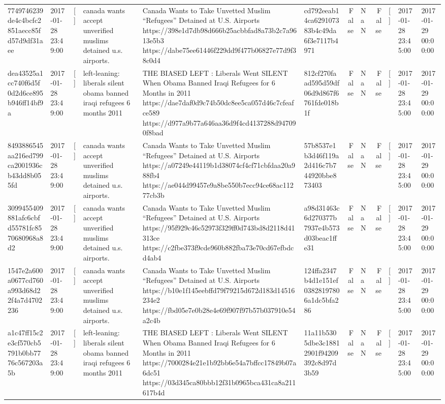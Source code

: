 \begin{tabular}{llllllrlrlll}
7749746239de4c4bcfc2851aecc85fd57d9df31aee & 2017-01-28 23:49:00 & [] & canada wants accept unverified muslims detained u.s. airports. & Canada Wants to Take Unvetted Muslim “Refugees” Detained at U.S. Airports https://398e1d7db98d666b25acbbfad8a73b2c7a9613e5b3 https://dabe75ee61446f229dd9f477b06827e77d9f38c0d4 & cd792eeab14ca629107383b4c49da6f3e7117b4971 & False & NaN & False & [] & 2017-01-28 23:45:00 & 2017-01-29 00:00:00 \\
dea43525a1cc740f6d5f0d2d6ce895b946ff14bf9a & 2017-01-28 23:49:00 & [] & left-leaning: liberals silent obama banned iraqi refugees 6 months 2011 & THE BIASED LEFT : Liberals Went SILENT When Obama Banned Iraqi Refugees for 6 Months in 2011 https://dae7daf0d9c74b50dc8ee5ca057d46c7cfeafce589 https://d977a9b77a646aa36d9f4cd4137288d947090f8bad & 812cf270faad595d59df06d9d867f6761fde018b1f & False & NaN & False & [] & 2017-01-28 23:45:00 & 2017-01-29 00:00:00 \\
8493886545aa216ed799ca2001936cb43dd8b055fd & 2017-01-28 23:49:00 & [] & canada wants accept unverified muslims detained u.s. airports. & Canada Wants to Take Unvetted Muslim “Refugees” Detained at U.S. Airports https://a07249e44119b1d38074cf4cf71cbfdaa20a988fb4 https://ae044d99457e9a8be550b7ecc94ce68ac11277cb3b & 57b8537e1b3d46f119a2d416c7b744920bbe873403 & False & NaN & False & [] & 2017-01-28 23:45:00 & 2017-01-29 00:00:00 \\
3099455409881afc6cbfd55781fc8570680968a8d2 & 2017-01-28 23:49:00 & [] & canada wants accept unverified muslims detained u.s. airports. & Canada Wants to Take Unvetted Muslim “Refugees” Detained at U.S. Airports https://95f929c46c52973f329ff0d743bd8d2118d41313ce https://c2fbe373f9cde960b882fba73e70cd67efbdcd4ab4 & a98d31463c6d270377b7937e4b573d03beac1ffe31 & False & NaN & False & [] & 2017-01-28 23:45:00 & 2017-01-29 00:00:00 \\
1547e2a600a0677cd760a993d68d22f4a7d4702236 & 2017-01-28 23:49:00 & [] & canada wants accept unverified muslims detained u.s. airports. & Canada Wants to Take Unvetted Muslim “Refugees” Detained at U.S. Airports https://b10e1f145eebffd79f79215d672d183d14516234e2 https://fbd05e7e0b28e4e69f907f97b57b037910e54a2c4b & 124ffa2347b4d1e151ef03828197806a1dc5bfa286 & False & NaN & False & [] & 2017-01-28 23:45:00 & 2017-01-29 00:00:00 \\
a1c47ff15c2e3cf570cb5791b0bb7776c567203a5b & 2017-01-28 23:49:00 & [] & left-leaning: liberals silent obama banned iraqi refugees 6 months 2011 & THE BIASED LEFT : Liberals Went SILENT When Obama Banned Iraqi Refugees for 6 Months in 2011 https://7000284e21e1b92bb6e54a7bffcc17849b07a6dc51 https://03d345ca80bbb12f31b0965bca431ca8a211617b4d & 11a11b5305dbe3c18812901f94209392c8d97d3b59 & False & NaN & False & [] & 2017-01-28 23:45:00 & 2017-01-29 00:00:00 \\

\end{tabular}
